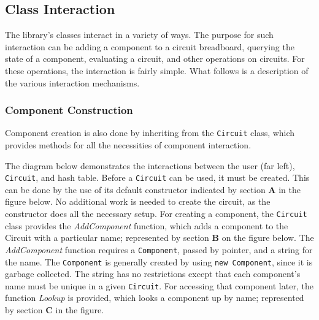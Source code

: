 \documentclass{article}
\newcommand{\Bold}[1]{\textbf{#1}}
\newcommand{\ClassName}[1]{\texttt{#1}}
\newcommand{\FunctionName}[1]{\textit{#1}}
\begin{document}
\subsection{Class Interaction}

The library's classes interact in a variety of ways. The purpose for such interaction can be adding a component to a circuit breadboard, querying the state of a component, evaluating a circuit, and other operations on circuits. For these operations, the interaction is fairly simple. What follows is a description of the various interaction mechanisms.

\subsubsection{Component Construction}

Component creation is also done by inheriting from the \ClassName{Circuit} class, which provides methods for all the necessities of component interaction.

The diagram below demonstrates the interactions between the user (far left), \ClassName{Circuit}, and hash table. Before a \ClassName{Circuit} can be used, it must be created. This can be done by the use of its default constructor indicated by section \Bold{A} in the figure below. No additional work is needed to create the circuit, as the constructor does all the necessary setup. For creating a component, the \ClassName{Circuit} class provides the \FunctionName{AddComponent} function, which adds a component to the Circuit with a particular name; represented by section \Bold{B} on the figure below. The \FunctionName{AddComponent} function requires a \ClassName{Component}, passed by pointer, and a string for the name. The \ClassName{Component} is generally created by using \ClassName{new~Component}, since it is garbage collected. The string has no restrictions except that each component’s name must be unique in a given \ClassName{Circuit}. For accessing that component later, the function \FunctionName{Lookup}
is
provided, which looks a component up by name; represented by section \Bold{C} in the figure.
\end{document}
